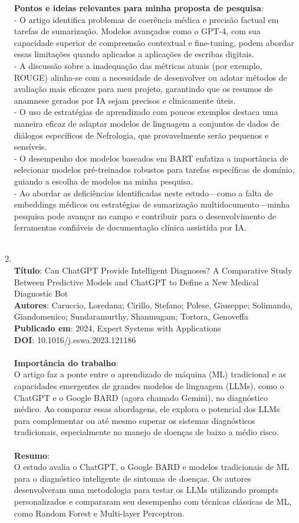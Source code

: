 \documentclass[
	article,
	11pt,
	oneside,
	a4paper,
	english,
	brazil,
	sumario=tradicional
	]{abntex2}
\begin{document}
\begin{enumerate}
\textbf{Pontos e ideias relevantes para minha proposta de pesquisa}:\\
- O artigo identifica problemas de coerência médica e precisão factual em tarefas de sumarização. Modelos avançados como o GPT-4, com sua capacidade superior de compreensão contextual e fine-tuning, podem abordar essas limitações quando aplicados a aplicações de escribas digitais.\\
- A discussão sobre a inadequação das métricas atuais (por exemplo, ROUGE) alinha-se com a necessidade de desenvolver ou adotar métodos de avaliação mais eficazes para meu projeto, garantindo que os resumos de anamnese gerados por IA sejam precisos e clinicamente úteis.\\
- O uso de estratégias de aprendizado com poucos exemplos destaca uma maneira eficaz de adaptar modelos de linguagem a conjuntos de dados de diálogos específicos de Nefrologia, que provavelmente serão pequenos e sensíveis.\\
- O desempenho dos modelos baseados em BART enfatiza a importância de selecionar modelos pré-treinados robustos para tarefas específicas de domínio, guiando a escolha de modelos na minha pesquisa.
\\
- Ao abordar as deficiências identificadas neste estudo—como a falta de embeddings médicos ou estratégias de sumarização multidocumento—minha pesquisa pode avançar no campo e contribuir para o desenvolvimento de ferramentas confiáveis de documentação clínica assistida por IA.
\\ \\
\item \cite{caruccio2024can}
\\
\textbf{Título}: Can ChatGPT Provide Intelligent Diagnoses? A Comparative Study Between Predictive Models and ChatGPT to Define a New Medical Diagnostic Bot
\\
\textbf{Autores}: Caruccio, Loredana; Cirillo, Stefano; Polese, Giuseppe; Solimando, Giandomenico; Sundaramurthy, Shanmugam; Tortora, Genoveffa
\\
\textbf{Publicado em}: 2024, Expert Systems with Applications
\\
\textbf{DOI}: 10.1016/j.eswa.2023.121186
\\
\\
\textbf{Importância do trabalho}:
\\
O artigo faz a ponte entre o aprendizado de máquina (ML) tradicional e as capacidades emergentes de grandes modelos de linguagem (LLMs), como o ChatGPT e o Google BARD (agora chamado Gemini), no diagnóstico médico. Ao comparar essas abordagens, ele explora o potencial dos LLMs para complementar ou até mesmo superar os sistemas diagnósticos tradicionais, especialmente no manejo de doenças de baixo a médio risco.
\\ \\
\textbf{Resumo}:\\
O estudo avalia o ChatGPT, o Google BARD e modelos tradicionais de ML para o diagnóstico inteligente de sintomas de doenças. Os autores desenvolveram uma metodologia para testar os LLMs utilizando prompts personalizados e compararam seu desempenho com técnicas clássicas de ML, como Random Forest e Multi-layer Perceptron.


\end{enumerate}
\end{document}
